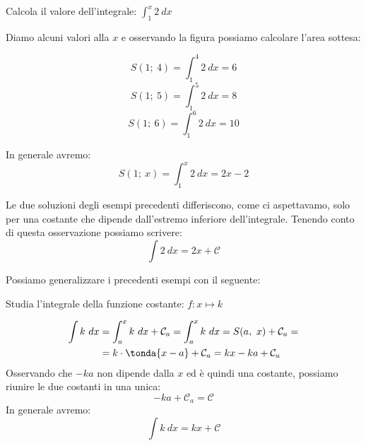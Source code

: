 \begin{esempio}
Calcola il valore dell'integrale: \(\int_1^x 2~dx\)

Diamo alcuni valori alla \(x\) e osservando la figura possiamo calcolare 
l'area sottesa:

\begin{minipage}{.59 \textwidth} 
\[S(1;~4) = \int_1^4 2~dx = 6\] 
\[S(1;~5) = \int_1^5 2~dx = 8\] 
\[S(1;~6) = \int_1^6 2~dx = 10\]

In generale avremo: 
\[S(1;~x) = \int_1^x 2~dx = 2x -2\]
\end{minipage}
\hfill
\begin{minipage}{.39 \textwidth}
\begin{inaccessibleblock}[] 
  \begin{center}  \end{center}
\end{inaccessibleblock}
\end{minipage}
\end{esempio}

Le due soluzioni degli esempi precedenti differiscono, come ci aspettavamo, 
solo per una costante che dipende dall'estremo inferiore dell'integrale. 
Tenendo conto di questa osservazione possiamo scrivere:
\[\int 2~dx = 2x + \mathcal{C}\]

Possiamo generalizzare i precedenti esempi con il seguente:

\begin{esempio}
Studia l'integrale della funzione costante: \(f: x \mapsto k\)

\begin{minipage}{.59 \textwidth}
\begin{align*}
\int k~dx &= \int_a^x k~dx + \mathcal{C}_a =
             \int_a^x k~dx = S(a,~x) + \mathcal{C}_a = \\
          &= k \cdot \tonda{x -a} + \mathcal{C}_a = 
             kx - ka + \mathcal{C}_a
\end{align*}
Osservando che \(-ka\) non dipende dalla \(x\) ed è quindi una costante, 
possiamo riunire le due costanti in una unica:
\[-ka + \mathcal{C}_a = \mathcal{C}\]
In generale avremo: 
\[\int k~dx = kx + \mathcal{C}\]
\end{minipage}
\hfill
\begin{minipage}{.39 \textwidth}
\begin{inaccessibleblock}[] 
  \begin{center}  \end{center}
\end{inaccessibleblock}
\end{minipage}
\end{esempio}

